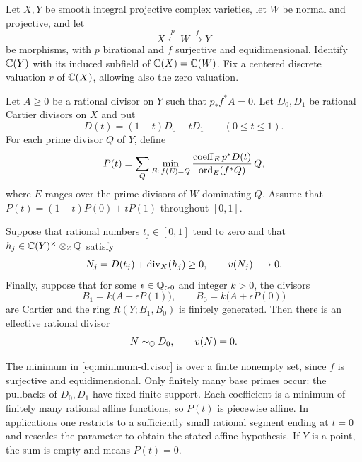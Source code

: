 \begin{proposition}
\label{prop:geometric}
Let \(X,Y\) be smooth integral projective complex varieties, let \(W\)
be normal and projective, and let
\[
X\xleftarrow{\ p\ }W\xrightarrow{\ f\ }Y
\]
be morphisms, with \(p\) birational and \(f\) surjective and
equidimensional. Identify \(\mathbb C(Y)\) with its induced subfield of
\(\mathbb C(X)=\mathbb C(W)\). Fix a centered discrete valuation \(v\) of
\(\mathbb C(X)\), allowing also the zero valuation.

Let \(A\geq0\) be a rational divisor on \(Y\) such that
\(p_*f^*A=0\). Let \(D_0,D_1\) be rational Cartier divisors on \(X\)
and put
\[
D(t)=(1-t)D_0+tD_1\qquad(0\leq t\leq1).
\]
For each prime divisor \(Q\) of \(Y\), define
\begin{equation}
\label{eq:minimum-divisor}
P(t)=\sum_Q
\min_{E:\,f(E)=Q}
\frac{\operatorname{coeff}_E p^*D(t)}{\operatorname{ord}_E(f^*Q)}\,Q,
\end{equation}
where \(E\) ranges over the prime divisors of \(W\) dominating \(Q\).
Assume that \(P(t)=(1-t)P(0)+tP(1)\) throughout \([0,1]\).

Suppose that rational numbers \(t_j\in[0,1]\) tend to zero and that
\(h_j\in\mathbb C(Y)^\times\otimes_{\mathbb Z}\mathbb Q\) satisfy
\[
N_j=D(t_j)+\operatorname{div}_X(h_j)\geq0,\qquad v(N_j)\longrightarrow0.
\]
Finally, suppose that for some \(\epsilon\in\mathbb Q_{>0}\) and integer
\(k>0\), the divisors
\[
B_1=k\bigl(A+\epsilon P(1)\bigr),\qquad
B_0=k\bigl(A+\epsilon P(0)\bigr)
\]
are Cartier and the ring \(R(Y;B_1,B_0)\) is finitely generated.
Then there is an effective rational divisor
\[
N\sim_{\mathbb Q}D_0,\qquad v(N)=0.
\]
\end{proposition}

The minimum in \eqref{eq:minimum-divisor} is over a finite nonempty
set, since \(f\) is surjective and equidimensional. Only finitely many
base primes occur: the pullbacks of \(D_0,D_1\) have fixed finite
support. Each coefficient is a minimum of finitely many rational
affine functions, so \(P(t)\) is piecewise affine. In applications one
restricts to a sufficiently small rational segment ending at \(t=0\)
and rescales the parameter to obtain the stated affine hypothesis.
If \(Y\) is a point, the sum is empty and means \(P(t)=0\).

